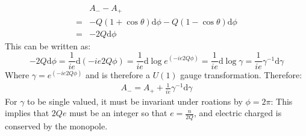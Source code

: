 \documentclass[12pt,a4]{article}
\newcommand{\e}{\mathrm{d}}
\begin{document}
\begin{enumerate}
\begin{enumerate}
        \begin{align*}
                      & A_- - A_+ \\
                     =& -Q (1 + \cos \theta) \e \phi -  Q (1 - \cos \theta) \e \phi \\
                     =& - 2 Q \e \phi
        \end{align*}
        This can be written as:
        \begin{equation*}
          - 2 Q \e \phi = \frac{1}{ie} \e (-i e 2 Q \phi) = \frac{1}{ie} \e \log e^{(-i e 2 Q \phi)} = \frac{1}{ie} \e \log \gamma = \frac{1}{ie} \gamma^{-1} \e \gamma
        \end{equation*}
        Where $\gamma = e^{(-i e 2 Q \phi)}$ and is therefore a $U(1)$ gauge transformation.
        Therefore:
        \begin{align*}
          A_- = A_+ + \frac{1}{ie} \gamma^{-1} \e \gamma
        \end{align*}
        For $\gamma$ to be single valued, it must be invariant under roations by $\phi = 2 \pi$:
        This implies that $2 Q e$ must be an integer so that $e = \frac{n}{2Q}$, and electric charged is conserved by the monopole.
        

\end{enumerate}
\end{enumerate}
\end{document}
